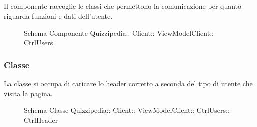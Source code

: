 \subsection{}
Il componente raccoglie le classi che permettono la comunicazione per quanto riguarda funzioni e dati dell'utente.
\begin{figure}[H]
\centering
\noindent{}
\caption[Schema Componente Quizzipedia::Client::ViewModelClient::CtrlUsers]{Schema Componente Quizzipedia:: Client:: ViewModelClient:: CtrlUsers}
\end{figure}
\subsubsection{Classe }
La classe si occupa di caricare lo header corretto a seconda del tipo di utente che visita la pagina.
\begin{figure}[H]
\centering
\noindent{}
\caption[Schema Classe CtrlHeader]{Schema Classe Quizzipedia:: Client:: ViewModelClient:: CtrlUsers:: CtrlHeader}
\end{figure}
